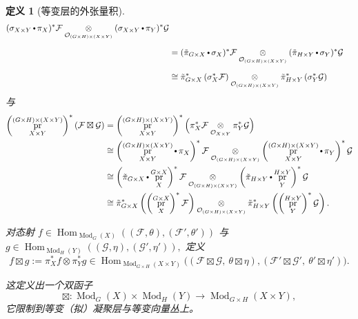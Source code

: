 \documentclass[11pt,a4paper]{article}
\DeclareMathOperator{\Mod}{\mathrm{Mod}}
\DeclareMathOperator{\Hom}{\operatorname{Hom}}
\DeclareMathOperator{\pr}{\operatorname{pr}}
\DeclareMathOperator{\comp}{\vcenter{\hbox{\scalebox{0.65}{$\bullet$}}}}
\theoremstyle{cnth}
\newtheorem{defn}[thm]{定义}
\begin{document}
\begin{defn}[等变层的外张量积]
\begin{align*}
(\sigma_{X\times Y}\comp\pi_X)^*\mathcal{F}
\underset{\mathcal{O}_{(G\times H)\times(X\times Y)}}{\otimes}
(\sigma_{X\times Y}\comp\pi_Y)^*\mathcal{G}
\\[2mm]
&=
(\tilde{\pi}_{G\times X}\comp \sigma_X)^*\mathcal{F}
\underset{\mathcal{O}_{(G\times H)\times(X\times Y)}}{\otimes}
(\tilde{\pi}_{H\times Y}\comp \sigma_Y)^*\mathcal{G}
\\[2mm]
&\cong
\tilde{\pi}_{G\times X}^*\left(\sigma_X^*\mathcal{F}\right)
\underset{\mathcal{O}_{(G\times H)\times(X\times Y)}}{\otimes}
\tilde{\pi}_{H\times Y}^*\left(\sigma_Y^*\mathcal{G}\right)
\end{align*}
与
\begin{align*}
\left(\pr_{X\times Y}^{(G\times H)\times(X\times Y)}\right)^*
(\mathcal{F}\boxtimes\mathcal{G})
&=
\left(\pr_{X\times Y}^{(G\times H)\times(X\times Y)}\right)^*
\Big(
\pi_X^*\mathcal{F}
\underset{\mathcal{O}_{X\times Y}}{\otimes}
\pi_Y^*\mathcal{G}
\Big)
\\
&\cong
\left(\pr_{X\times Y}^{(G\times H)\times(X\times Y)}\comp\pi_X\right)^*\mathcal{F}
\underset{\mathcal{O}_{(G\times H)\times(X\times Y)}}{\otimes}
\left(\pr_{X\times Y}^{(G\times H)\times(X\times Y)}\comp\pi_Y\right)^*\mathcal{G}
\\
&\cong
\left(\tilde{\pi}_{G\times X}\comp\pr_X^{G\times X}\right)^*\mathcal{F}
\underset{\mathcal{O}_{(G\times H)\times(X\times Y)}}{\otimes}
\left(\tilde{\pi}_{H\times Y}\comp\pr_Y^{H\times Y}\right)^*\mathcal{G}
\\
&\cong
\tilde{\pi}_{G\times X}^*\left(\left(\pr_X^{G\times X}\right)^*\mathcal{F}\right)
\underset{\mathcal{O}_{(G\times H)\times(X\times Y)}}{\otimes}
\tilde{\pi}_{H\times Y}^*\left(\left(\pr_Y^{H\times Y}\right)^*\mathcal{G}\right).
\end{align*}

对态射
$
f
\in
\Hom_{\Mod_G(X)}
((\mathcal{F},\theta),(\mathcal{F}',\theta'))
$
与
$
g
\in
\Hom_{\Mod_H(Y)}
((\mathcal{G},\eta),(\mathcal{G}',\eta')),
$
定义
$$
f\boxtimes g
:=
\pi_X^*f
\otimes
\pi_Y^*g
\in
\Hom_{\Mod_{G\times H}(X\times Y)}
\big(
\left(
\mathcal{F}\boxtimes\mathcal{G},
\
\theta\boxtimes\eta
\right),
\left(
\mathcal{F}'\boxtimes\mathcal{G}',
\
\theta'\boxtimes\eta'
\right)
\big).
$$

这定义出一个双函子
$$
\boxtimes:
\Mod_G(X)\times\Mod_H(Y)
\rightarrow
\Mod_{G\times H}(X\times Y),
$$
它限制到等变（拟）凝聚层与等变向量丛上。
\end{defn}
\end{document}
